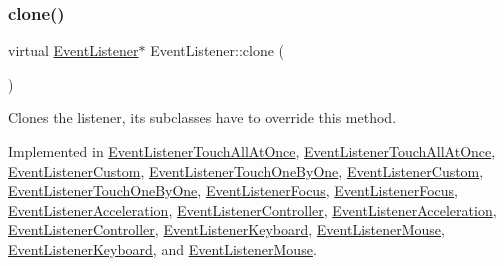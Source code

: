 \mbox{\label{classEventListener_a8707b41e85031f08e48def3584d51bc0}} 
\subsubsection{\texorpdfstring{clone()}{clone()}\hspace{0.1cm}{\footnotesize\ttfamily [1/2]}}
{\footnotesize\ttfamily virtual \hyperlink{classEventListener}{Event\+Listener}$\ast$ Event\+Listener\+::clone (\begin{DoxyParamCaption}{ }\end{DoxyParamCaption})\hspace{0.3cm}{\ttfamily [pure virtual]}}

Clones the listener, its subclasses have to override this method. 

Implemented in \hyperlink{classEventListenerTouchAllAtOnce_a0b2fd9403e7ea1548ad3ccc54270df4f}{Event\+Listener\+Touch\+All\+At\+Once}, \hyperlink{classEventListenerTouchAllAtOnce_ab746dbbce44cceb3916ba7a81be36ede}{Event\+Listener\+Touch\+All\+At\+Once}, \hyperlink{classEventListenerCustom_a2b1c47443d2288b0b4a5b53fe35914ba}{Event\+Listener\+Custom}, \hyperlink{classEventListenerTouchOneByOne_aeb19046f96745ff3cb49ba4ee92a8335}{Event\+Listener\+Touch\+One\+By\+One}, \hyperlink{classEventListenerCustom_a9a8bffb7f8169c9ca32aba3bf4cd74bc}{Event\+Listener\+Custom}, \hyperlink{classEventListenerTouchOneByOne_ab6fd6db6eefeb57abf3f0aca46d0b5c8}{Event\+Listener\+Touch\+One\+By\+One}, \hyperlink{classEventListenerFocus_a947808a74abc88554f23668cebff1a7d}{Event\+Listener\+Focus}, \hyperlink{classEventListenerFocus_a0c1533bf324759353479a453ac10981f}{Event\+Listener\+Focus}, \hyperlink{classEventListenerAcceleration_aaa4f9b30d3b8514511ffe2126c92722d}{Event\+Listener\+Acceleration}, \hyperlink{classEventListenerController_a10c944bc699aac977f85d8b8bdc65e15}{Event\+Listener\+Controller}, \hyperlink{classEventListenerAcceleration_afb99c69338b86b1af2ae8d564e229b54}{Event\+Listener\+Acceleration}, \hyperlink{classEventListenerController_ae4960229437589034e72b5c3dbb4a5c7}{Event\+Listener\+Controller}, \hyperlink{classEventListenerKeyboard_a6597435f0ccb2d981201b1c2de867f93}{Event\+Listener\+Keyboard}, \hyperlink{classEventListenerMouse_ae4c910ce9d885e1f1efc7cd380bee94a}{Event\+Listener\+Mouse}, \hyperlink{classEventListenerKeyboard_afef5b79568f3b28f9f1bacdfe90067f5}{Event\+Listener\+Keyboard}, and \hyperlink{classEventListenerMouse_a7696b08cd79fcc6ef6bc165c8e0bbf81}{Event\+Listener\+Mouse}.

